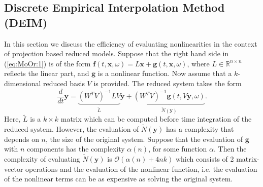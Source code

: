 \subsection{Discrete Empirical Interpolation Method (DEIM)} \label{chap:MoOr.DEIM:1} \nocite{Chaturantabut:2010cz}
In this section we {\edit discuss the efficiency} of evaluating nonlinearities {\edit in the context of} projection based reduced models. Suppose that the right hand side in (\ref{eq:MoOr:1}) is of the form $\mathbf f(t,\mathbf x , \omega) = L\mathbf x + \mathbf g(t,\mathbf x ,\omega)$, where $L\in \mathbb R^{n\times n}$ reflects the linear part, and $\mathbf g$ is a nonlinear function. Now {\edit assume that} a $k$-dimensional reduced basis $V$ is provided. The reduced system takes the form
\begin{equation} \label{eq:MoOr:8}
	\frac{d}{dt} \mathbf y = \underbrace{(W^TV)^{-1} L V}_{\tilde L} \mathbf{y} + \underbrace{(W^TV)^{-1} \mathbf g(t,V\mathbf y,\omega)}_{\tilde N (\mathbf y)}.
\end{equation}
Here, $\tilde L$ is a $k\times k$ matrix which can be computed before time integration of the reduced system. However, {\edit the} evaluation of $\tilde N (\mathbf y)$ has a complexity that depends on $n$, the size of the original system. Suppose that the evaluation of $\mathbf g$ with $n$ components has the complexity $\alpha(n)$, for some function $\alpha$. Then the complexity of evaluating $\tilde N(\mathbf y)$ is $\mathcal{O}(\alpha(n) + 4nk)$ which consists of 2 matrix-vector operations and the {\edit evaluation of the nonlinear function, i.e. the evaluation of the nonlinear terms can be as expensive as solving the original system.}

